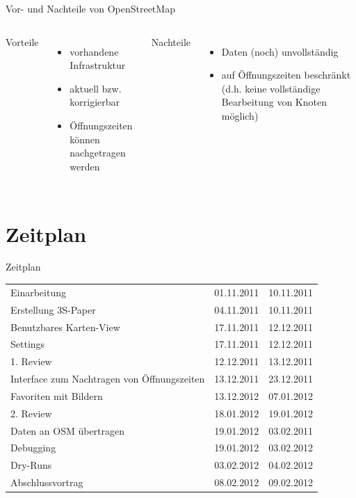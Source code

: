 \documentclass[hyperref]{beamer}
\begin{document}
\begin{frame}{Vor- und Nachteile von OpenStreetMap}
	\begin{columns}
		\column{5.1cm}
		Vorteile
		\begin{itemize}
			\item vorhandene Infrastruktur
			\item aktuell bzw. korrigierbar
			\item Öffnungszeiten können nachgetragen werden \phantom{~~~~~~~~~~~~~~}
		\end{itemize}		
		\column{6cm}
		Nachteile
		\begin{itemize}
			\item Daten (noch) unvollständig
			\item auf Öffnungszeiten beschränkt (d.h. keine vollständige Bearbeitung von Knoten möglich)
		\end{itemize}
	\end{columns}
\end{frame}

\section{Zeitplan}



\begin{frame}{Zeitplan}

		\begin{tabular}{l l l}
			Einarbeitung & 01.11.2011 & 10.11.2011\\
			Erstellung 3S-Paper & 04.11.2011 & 10.11.2011\\
			Benutzbares Karten-View & 17.11.2011 & 12.12.2011\\
			Settings & 17.11.2011 & 12.12.2011 \\
			1. Review & 12.12.2011 & 13.12.2011\\
			Interface zum Nachtragen von Öffnungszeiten & 13.12.2011 & 23.12.2011\\
			Favoriten mit Bildern & 13.12.2012 & 07.01.2012\\
			2. Review & 18.01.2012 & 19.01.2012\\
			Daten an OSM übertragen & 19.01.2012 & 03.02.2011\\
			Debugging & 19.01.2012 & 03.02.2012\\
			Dry-Runs & 03.02.2012 & 04.02.2012\\
			Abschlussvortrag & 08.02.2012 & 09.02.2012\\
		\end{tabular}

\end{frame}
\end{document}
